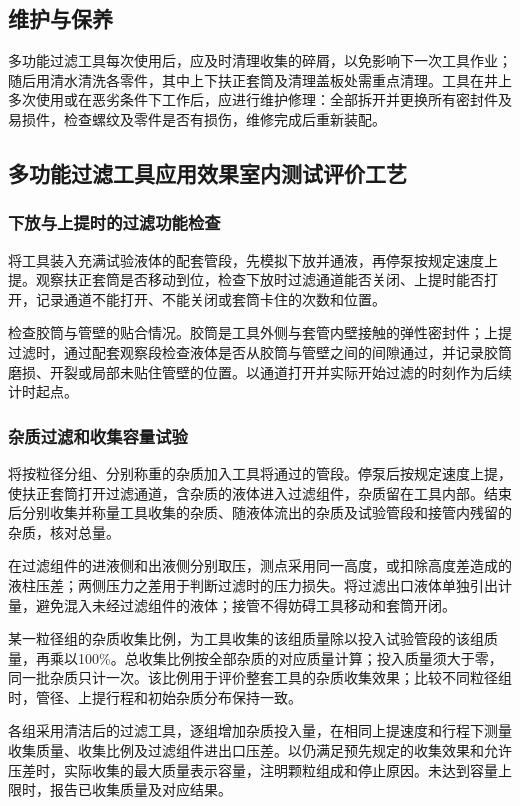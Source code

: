 
\subsection{维护与保养}

多功能过滤工具每次使用后，应及时清理收集的碎屑，以免影响下一次工具作业；随后用清水清洗各零件，其中上下扶正套筒及清理盖板处需重点清理。工具在井上多次使用或在恶劣条件下工作后，应进行维护修理：全部拆开并更换所有密封件及易损件，检查螺纹及零件是否有损伤，维修完成后重新装配。

\subsection{多功能过滤工具应用效果室内测试评价工艺}
\label{sec:eval-filter}

\subsubsection{下放与上提时的过滤功能检查}
将工具装入充满试验液体的配套管段，先模拟下放并通液，再停泵按规定速度上提。观察扶正套筒是否移动到位，检查下放时过滤通道能否关闭、上提时能否打开，记录通道不能打开、不能关闭或套筒卡住的次数和位置。

检查胶筒与管壁的贴合情况。胶筒是工具外侧与套管内壁接触的弹性密封件；上提过滤时，通过配套观察段检查液体是否从胶筒与管壁之间的间隙通过，并记录胶筒磨损、开裂或局部未贴住管壁的位置。以通道打开并实际开始过滤的时刻作为后续计时起点。

\subsubsection{杂质过滤和收集容量试验}
将按粒径分组、分别称重的杂质加入工具将通过的管段。停泵后按规定速度上提，使扶正套筒打开过滤通道，含杂质的液体进入过滤组件，杂质留在工具内部。结束后分别收集并称量工具收集的杂质、随液体流出的杂质及试验管段和接管内残留的杂质，核对总量。

在过滤组件的进液侧和出液侧分别取压，测点采用同一高度，或扣除高度差造成的液柱压差；两侧压力之差用于判断过滤时的压力损失。将过滤出口液体单独引出计量，避免混入未经过滤组件的液体；接管不得妨碍工具移动和套筒开闭。

某一粒径组的杂质收集比例，为工具收集的该组质量除以投入试验管段的该组质量，再乘以100\%。总收集比例按全部杂质的对应质量计算；投入质量须大于零，同一批杂质只计一次。该比例用于评价整套工具的杂质收集效果；比较不同粒径组时，管径、上提行程和初始杂质分布保持一致。

各组采用清洁后的过滤工具，逐组增加杂质投入量，在相同上提速度和行程下测量收集质量、收集比例及过滤组件进出口压差。以仍满足预先规定的收集效果和允许压差时，实际收集的最大质量表示容量，注明颗粒组成和停止原因。未达到容量上限时，报告已收集质量及对应结果。

